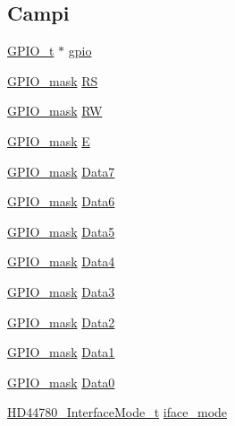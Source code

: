 \subsection*{Campi}
\begin{DoxyCompactItemize}
\item 
\hyperlink{struct_g_p_i_o__t}{G\+P\+I\+O\+\_\+t} $\ast$ \hyperlink{struct_h_d44780___l_c_d__t_acb3116190992a4d8d26545c103304d27}{gpio}
\item 
\hyperlink{group___g_p_i_o_ga6d5aef8a8a54ee2f602d47252ff66595}{G\+P\+I\+O\+\_\+mask} \hyperlink{struct_h_d44780___l_c_d__t_a142ae0db638dca7ab42e2183a1311d32}{R\+S}
\item 
\hyperlink{group___g_p_i_o_ga6d5aef8a8a54ee2f602d47252ff66595}{G\+P\+I\+O\+\_\+mask} \hyperlink{struct_h_d44780___l_c_d__t_af8225e4a125a2159215dfa03372c305f}{R\+W}
\item 
\hyperlink{group___g_p_i_o_ga6d5aef8a8a54ee2f602d47252ff66595}{G\+P\+I\+O\+\_\+mask} \hyperlink{struct_h_d44780___l_c_d__t_a851ed1cefdadae2e5069d1364ae8fc9e}{E}
\item 
\hyperlink{group___g_p_i_o_ga6d5aef8a8a54ee2f602d47252ff66595}{G\+P\+I\+O\+\_\+mask} \hyperlink{struct_h_d44780___l_c_d__t_a7f1bd9ea66e1fa6d0667c3f60d2f155d}{Data7}
\item 
\hyperlink{group___g_p_i_o_ga6d5aef8a8a54ee2f602d47252ff66595}{G\+P\+I\+O\+\_\+mask} \hyperlink{struct_h_d44780___l_c_d__t_a6a787746d32e0e18dbd57202e547756b}{Data6}
\item 
\hyperlink{group___g_p_i_o_ga6d5aef8a8a54ee2f602d47252ff66595}{G\+P\+I\+O\+\_\+mask} \hyperlink{struct_h_d44780___l_c_d__t_aff5ae7b6e5cd6f96a13e719cd07e3f15}{Data5}
\item 
\hyperlink{group___g_p_i_o_ga6d5aef8a8a54ee2f602d47252ff66595}{G\+P\+I\+O\+\_\+mask} \hyperlink{struct_h_d44780___l_c_d__t_a923c685eba8920c56f33117410da2742}{Data4}
\item 
\hyperlink{group___g_p_i_o_ga6d5aef8a8a54ee2f602d47252ff66595}{G\+P\+I\+O\+\_\+mask} \hyperlink{struct_h_d44780___l_c_d__t_ae6f2e7b5a4aa8b82451e021f2f5b3a89}{Data3}
\item 
\hyperlink{group___g_p_i_o_ga6d5aef8a8a54ee2f602d47252ff66595}{G\+P\+I\+O\+\_\+mask} \hyperlink{struct_h_d44780___l_c_d__t_afb22274224118a94688f1809cda55501}{Data2}
\item 
\hyperlink{group___g_p_i_o_ga6d5aef8a8a54ee2f602d47252ff66595}{G\+P\+I\+O\+\_\+mask} \hyperlink{struct_h_d44780___l_c_d__t_a9b310a22b76c920feb015a3a3084b125}{Data1}
\item 
\hyperlink{group___g_p_i_o_ga6d5aef8a8a54ee2f602d47252ff66595}{G\+P\+I\+O\+\_\+mask} \hyperlink{struct_h_d44780___l_c_d__t_aed1ef3393be1a14aa7b2644585e5bb08}{Data0}
\item 
\hyperlink{group___h_d44780_gaaaea8b73e24f7658da4118f6b01b45f0}{H\+D44780\+\_\+\+Interface\+Mode\+\_\+t} \hyperlink{struct_h_d44780___l_c_d__t_a7c5a51b8cc5de5ee2cf42b884bd1bc67}{iface\+\_\+mode}
\end{DoxyCompactItemize}


